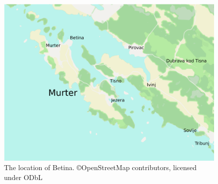 \documentclass[output=paper]{LSP/langsci}
\begin{document}
\begin{figure}[t]
\includegraphics[height=.47\textheight]{illustrations/skevin_betina4.pdf}
\caption{The location of Betina.  {\tiny ©OpenStreetMap contributors, licensed under ODbL}}
\label{fig:skevin:skevin:betinalocation} 
\end{figure}
\end{document}
